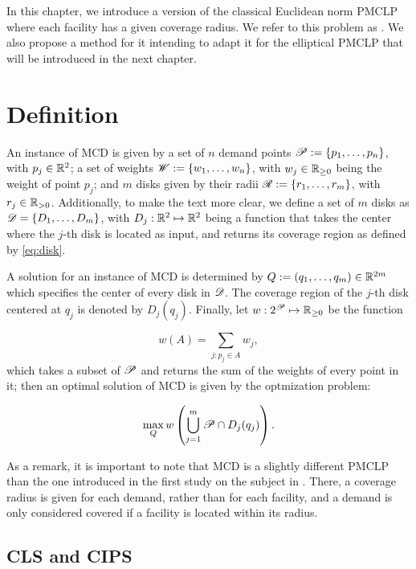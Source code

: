 In this chapter, we introduce a version of the classical Euclidean norm PMCLP where each facility has a given coverage radius. 
We refer to this problem as . We also propose a method for it intending to adapt it for the elliptical PMCLP that will be introduced in the next chapter. 

\section{Definition}

An instance of MCD is given by a set of $n$ demand points $\mathscr{P}:=\{p_1, \dots, p_n\}$, with $p_j\in\mathbb{R}^2$; a set of weights $\mathscr{W}:=\{w_1, \dots, w_n\}$, with $w_j\in\mathbb{R}_{\ge0}$ being the weight of point $p_j$; and $m$ disks given by their radii $\mathscr{R}:=\{r_1, \dots, r_m\}$, with $r_j\in\mathbb{R}_{>0}$. 
Additionally, to make the text more clear, we define a set of $m$ disks as $\mathscr{D} = \{D_1, \dots, D_m\}$, with $D_j : \mathbb{R}^2 \mapsto \mathbb{R}^2$ being a function that takes the center where the $j$-th disk is located as input, and returns its coverage region as defined by \autoref{eq:disk}.

A solution for an instance of MCD is determined by $Q:=(q_1, \dots, q_m) \in \mathbb{R}^{2m}$ which specifies the center of every disk in $\mathscr{D}$.
The coverage region of the $j$-th disk centered at $q_j$ is denoted by $D_j(q_j)$. Finally, let $w : 2^{\mathscr{P}} \mapsto \mathbb{R}_{\ge0}$ be the function

\begin{equation}\label{eq:subset_w}
w(A) = \sum_{j : p_j \in A} w_j,
\end{equation}
which takes a subset of $\mathscr{P}$ and returns the sum of the weights of every point in it; then an optimal solution of MCD is given by the optmization problem:

\begin{equation}
\max_{Q} w\left(\bigcup_{j=1}^m \mathscr{P} \cap D_j(q_j)\right).
\end{equation}

As a remark, it is important to note that MCD is a slightly different PMCLP than the one introduced in the first study on the subject in . There, a coverage radius is given for each demand, rather than for each facility, and a demand is only considered covered if a facility is located within its radius. 

\subsection{CLS and CIPS}

